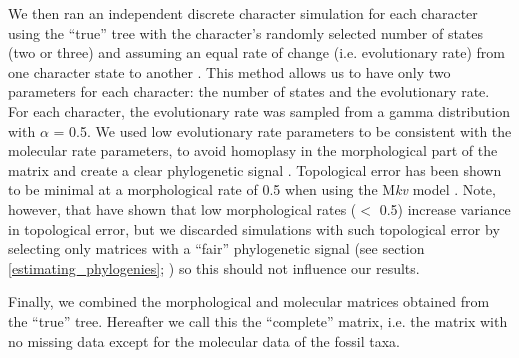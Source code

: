 We then ran an independent discrete character simulation for each character using the ``true'' tree with the character's randomly selected number of states (two or three) and assuming an equal rate of change (i.e. evolutionary rate) from one character state to another \citep{Pagel22011994}.
This method allows us to have only two parameters for each character: the number of states and the evolutionary rate.
For each character, the evolutionary rate was sampled from a gamma distribution with $\alpha$ = 0.5.
We used low evolutionary rate parameters to be consistent with the molecular rate parameters, to avoid homoplasy in the morphological part of the matrix and create a clear phylogenetic signal \citep{wrightbayesian2014}.
Topological error has been shown to be minimal at a morphological rate of 0.5 when using the M\textit{kv} model \citep{lewisa2001,wrightbayesian2014}.
Note, however, that \cite{wrightbayesian2014} have shown that low morphological rates ($<$ 0.5) increase variance in topological error, but we discarded simulations with such topological error by selecting only matrices with a ``fair'' phylogenetic signal (see section \ref{estimating_phylogenies}; \citealt{zanderminimal2004}) so this should not influence our results.



Finally, we combined the morphological and molecular matrices obtained from the ``true'' tree.
Hereafter we call this the ``complete'' matrix, i.e. the matrix with no missing data except for the molecular data of the fossil taxa.



